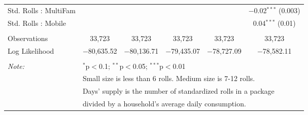 \begin{table}[!htbp]
\begin{tabular}{@{\extracolsep{5pt}}lccccc}
  Std. Rolls : MultiFam &  &  &  &  & $-$0.02$^{***}$ (0.003) \\ 
  Std. Rolls : Mobile &  &  &  &  & 0.04$^{***}$ (0.01) \\ 
 \hline \\[-1.8ex] 
Observations & 33,723 & 33,723 & 33,723 & 33,723 & 33,723 \\ 
Log Likelihood & $-$80,635.52 & $-$80,136.71 & $-$79,435.07 & $-$78,727.09 & $-$78,582.11 \\ 
\hline 
\hline \\[-1.8ex] 
\textit{Note:}  & \multicolumn{5}{l}{$^{*}$p$<$0.1; $^{**}$p$<$0.05; $^{***}$p$<$0.01} \\ 
 & \multicolumn{5}{l}{Small size is less than 6 rolls. Medium size is 7-12 rolls. } \\ 
 & \multicolumn{5}{l}{Days' supply is the number of standardized rolls in a package} \\ 
 & \multicolumn{5}{l}{divided by a household's average daily consumption.} \\ 
\end{tabular} 
\end{table} 
